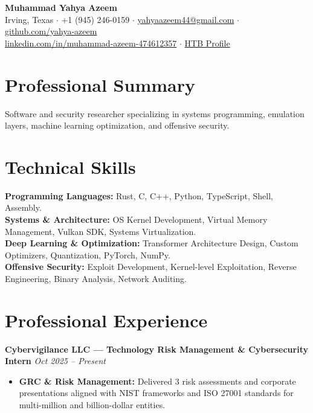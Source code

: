 \documentclass[10pt,letterpaper]{article}
\newcommand{\achievement}[2]{
    \noindent\textbf{\color{primary}#1} \hfill \textit{#2}
}
\begin{document}
\begin{center}
    {\Huge\bfseries\color{primary} Muhammad Yahya Azeem} \\
    \vspace{3pt}
    \small
    Irving, Texas $\cdot$ +1 (945) 246-0159 $\cdot$ \href{mailto:yahyaazeem44@gmail.com}{yahyaazeem44@gmail.com} $\cdot$ \href{https://github.com/yahya-azeem}{github.com/yahya-azeem} \\
    \vspace{2pt}
    \href{https://www.linkedin.com/in/muhammad-azeem-474612357/}{linkedin.com/in/muhammad-azeem-474612357} $\cdot$ 
    \href{https://profile.hackthebox.com/profile/019c6962-e472-7141-bfee-10910c4881e8}{HTB Profile}
\end{center}

\vspace{-4pt}

\section*{Professional Summary}
Software and security researcher specializing in systems programming, emulation layers, machine learning optimization, and offensive security.

\section*{Technical Skills}
\noindent\textbf{Programming Languages:} Rust, C, C++, Python, TypeScript, Shell, Assembly. \\
\noindent\textbf{Systems \& Architecture:} OS Kernel Development, Virtual Memory Management, Vulkan SDK, Systems Virtualization. \\
\noindent\textbf{Deep Learning \& Optimization:} Transformer Architecture Design, Custom Optimizers, Quantization, PyTorch, NumPy. \\
\noindent\textbf{Offensive Security:} Exploit Development, Kernel-level Exploitation, Reverse Engineering, Binary Analysis, Network Auditing.

\section*{Professional Experience}
\achievement{Cybervigilance LLC — Technology Risk Management \& Cybersecurity Intern}{Oct 2025 -- Present}
\begin{itemize}
    \item \textbf{GRC \& Risk Management:} Delivered 3 risk assessments and corporate presentations aligned with NIST frameworks and ISO 27001 standards for multi-million and billion-dollar entities.
\end{itemize}
\end{document}
